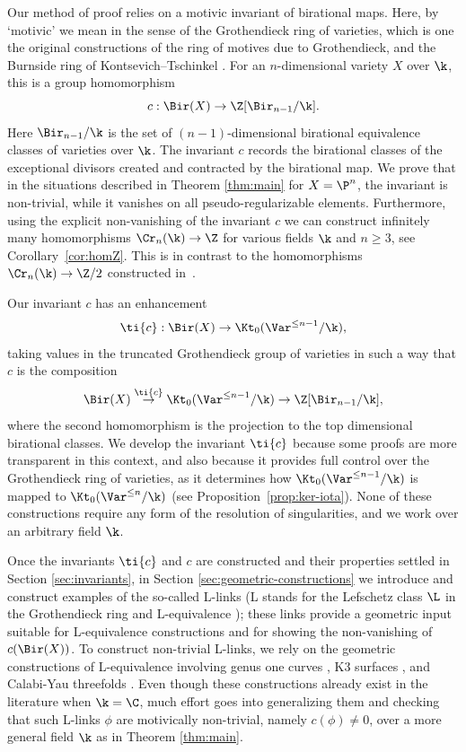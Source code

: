 

Our method of proof relies on a
motivic
invariant of birational maps.
Here, by `motivic' we mean
in the sense of
the Grothendieck ring of varieties,
which is one the original
constructions
of the ring of motives due to Grothendieck,
and the Burnside ring of Kontsevich--Tschinkel
\cite{KontsevichTschinkel}.
For an $n$-dimensional variety $X$ over $\k$,
this is a group homomorphism
\[
c: \Bir(X) \to \Z[\Bir_{n-1}/\k].
\]
Here $\Bir_{n-1}/\k$ is the set of $(n-1)$-dimensional
birational
equivalence classes of varieties over $\k$.
The invariant $c$ records the birational
classes of
the exceptional divisors created
and contracted by the birational map.
We prove that in the situations described
in Theorem \ref{thm:main} for $X = \P^n$,
the invariant
is non-trivial,
while it vanishes on all pseudo-regularizable elements.
Furthermore,
using the explicit non-vanishing of the
invariant $c$ we can
construct infinitely many
homomorphisms $\Cr_n(\k) \to \Z$ for various
fields $\k$ and $n \ge 3$, see Corollary~\ref{cor:homZ}.
This is in contrast to the
homomorphisms $\Cr_n(\k) \to \Z/2$ constructed in~\cite{BLZ}.


Our invariant $c$
has an enhancement
\[
\ti{c}: \Bir(X) \to \Kt_0(\Var^{\le n-1}/\k),
\]
taking values in the truncated
Grothendieck group of varieties
in such a way that $c$ is the composition
\[
\Bir(X) \overset{\ti{c}}{\to} \Kt_0(\Var^{\le n-1}/\k) \to \Z[\Bir_{n-1}/\k],
\]
where the second homomorphism is the projection to the top dimensional
birational classes. We develop the invariant $\ti{c}$
because some proofs are more transparent in this context,
and also because
it provides full control over
the Grothendieck ring of varieties,
as it determines how
$\Kt_0(\Var^{\le n-1}/\k)$ is mapped to $\Kt_0(\Var^{\le n}/\k)$
(see Proposition~\ref{prop:ker-iota}).
None of these constructions require
any form of the
resolution of singularities, and
we work over an arbitrary field
$\k$.

Once the invariants $\ti{c}$ and $c$ are constructed
and their properties settled in Section \ref{sec:invariants},
in Section \ref{sec:geometric-constructions}
we introduce and
construct examples of the so-called L-links
(L stands for the Lefschetz class $\L$
in the Grothendieck ring and L-equivalence \cite{KuznetsovShinder});
these links provide a geometric input suitable
for L-equivalence constructions
and for showing the non-vanishing of $c(\Bir(X))$.
To construct non-trivial L-links,
we rely on the geometric constructions
of L-equivalence
involving genus one curves
\cite{Mori-Mukai,Crauder-Katz,ShinderZhang},
K3 surfaces \cite{HassettLai},
and Calabi-Yau threefolds \cite{IMOUG2}.
Even though these constructions already exist in the literature when
$\k = \C$,
much effort goes into generalizing them and checking
that such L-links $\phi$ are motivically non-trivial,
namely $c(\phi) \ne 0$,
over a more general field $\k$ as in Theorem \ref{thm:main}.


